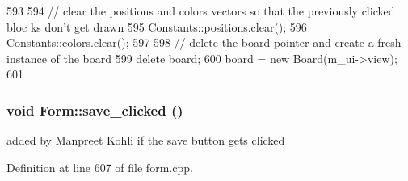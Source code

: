 \begin{DoxyCode}
593 {
594     // clear the positions and colors vectors so that the previously clicked bloc
      ks don't get drawn
595     Constants::positions.clear();
596     Constants::colors.clear();
597 
598     // delete the board pointer and create a fresh instance of the board
599     delete board;
600     board = new Board(m_ui->view);
601 }
\end{DoxyCode}
\hypertarget{class_form_aefe8e4d932a234a6e50e93be2618bac3}{
\subsubsection[{save\_\-clicked}]{\setlength{\rightskip}{0pt plus 5cm}void Form::save\_\-clicked ()}}
\label{class_form_aefe8e4d932a234a6e50e93be2618bac3}
added by Manpreet Kohli if the save button gets clicked 

Definition at line 607 of file form.cpp.


